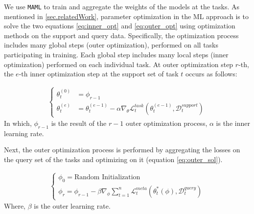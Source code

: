 \documentclass[aps,prb,groupedaddress,twocolumn,showpacs,dvipdfmx,superscriptaddress,pdftex]{revtex4-2}
\begin{document}
We use \verb|MAML| to train and aggregate the weights of the models at the tasks. As mentioned in \ref{sec.relatedWork}, parameter optimization in the ML approach is to solve the two equations \ref{eq:inner_opt} and \ref{eq:outer_opt} using optimization methods on the support and query data. Specifically, the optimization process includes many global steps (outer optimization), performed on all tasks participating in training. Each global step includes many local steps (inner optimization) performed on each individual task. At outer optimization step $r$-th, the $e$-th inner optimization step at the support set of task $t$ occurs as follows:

\begin{align}
    \begin{cases}
        \theta_t^{(0)} &= \phi_{r-1} \\
        \theta_t^{(e)} &= \theta_t^{(e-1)} - \alpha \nabla_{\theta} \mathcal{L}^{task}_t\left( \theta_t^{(e-1)}, \mathcal{D}_t^{support} \right)
    \end{cases}
\end{align} In which, $\phi_{r-1}$ is the result of the $r-1$ outer optimization process, $\alpha$ is the inner learning rate.

\vspace{2mm}


Next, the outer optimization process is performed by aggregating the losses on the query set of the tasks and optimizing on it (equation \ref{eq:outer_sol}).

\begin{align}
    \begin{cases}
        \phi_0 = \text{Random Initialization}\\
        \phi_r = \phi_{r-1} - \beta \nabla_{\phi} \sum_{t=1}^n{\mathcal{L}^{meta}_t \left( \theta_t^*(\phi), \mathcal{D}_t^{query} \right)}
    \end{cases}
    \label{eq:outer_sol}
\end{align} Where, $\beta$ is the outer learning rate.

\vspace{2mm}

\end{document}
